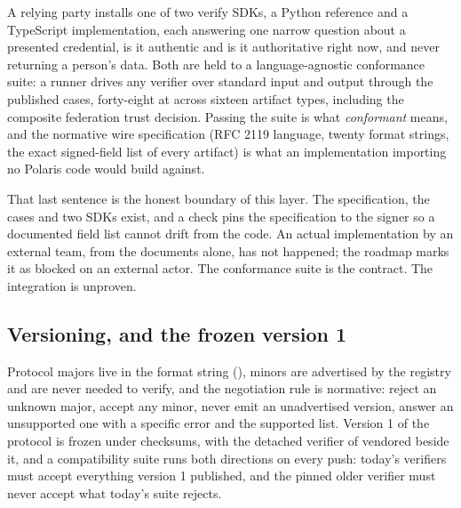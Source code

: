 A relying party installs one of two verify SDKs, a Python reference and a TypeScript implementation,
each answering one narrow question about a presented credential, is it authentic and is it
authoritative right now, and never returning a person's data. Both are held to a language-agnostic
conformance suite: a runner drives any verifier over standard input and output through the published
cases, forty-eight at  across sixteen artifact types, including the composite federation
trust decision. Passing the suite is what \emph{conformant} means, and the normative wire
specification (RFC 2119 language, twenty format strings, the exact signed-field list of every
artifact) is what an implementation importing no Polaris code would build against. \sImpl

That last sentence is the honest boundary of this layer. The specification, the cases and two SDKs
exist, and a check pins the specification to the signer so a documented field list cannot drift from
the code. An actual implementation by an external team, from the documents alone, has not happened;
the roadmap marks it as blocked on an external actor. The conformance suite is the contract. The
integration is unproven. \sExt

\subsection{Versioning, and the frozen version 1}

Protocol majors live in the format string (), minors are advertised by the
registry and are never needed to verify, and the negotiation rule is normative: reject an unknown
major, accept any minor, never emit an unadvertised version, answer an unsupported one with a
specific error and the supported list. Version 1 of the protocol is frozen under checksums, with the
detached verifier of  vendored beside it, and a compatibility suite runs both directions
on every push: today's verifiers must accept everything version 1 published, and the pinned older
verifier must never accept what today's suite rejects. \sImpl

